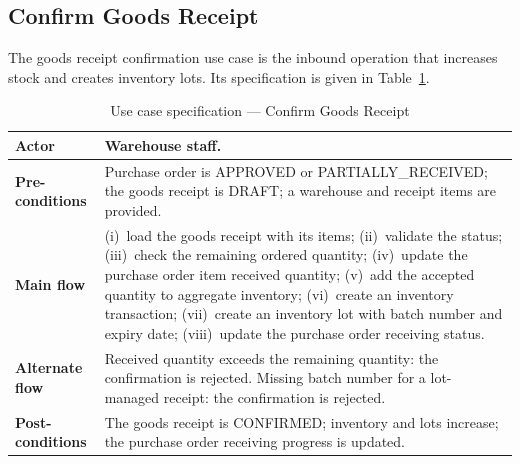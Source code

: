 \subsection{Confirm Goods Receipt}
The goods receipt confirmation use case is the inbound operation that increases
stock and creates inventory lots. Its specification is given in
Table~\ref{tab:uc-gr}.
\begin{table}[H]\centering
\caption{Use case specification --- Confirm Goods Receipt}
\label{tab:uc-gr}
\begin{tabular}{|p{3cm}|p{11cm}|}
\hline
\textbf{Actor} & Warehouse staff. \\ \hline
\textbf{Pre-conditions} & Purchase order is APPROVED or PARTIALLY\_RECEIVED; the goods receipt is DRAFT; a warehouse and receipt items are provided. \\ \hline
\textbf{Main flow} & (i)~load the goods receipt with its items; (ii)~validate the status; (iii)~check the remaining ordered quantity; (iv)~update the purchase order item received quantity; (v)~add the accepted quantity to aggregate inventory; (vi)~create an inventory transaction; (vii)~create an inventory lot with batch number and expiry date; (viii)~update the purchase order receiving status. \\ \hline
\textbf{Alternate flow} & Received quantity exceeds the remaining quantity: the confirmation is rejected. Missing batch number for a lot-managed receipt: the confirmation is rejected. \\ \hline
\textbf{Post-conditions} & The goods receipt is CONFIRMED; inventory and lots increase; the purchase order receiving progress is updated. \\ \hline
\end{tabular}
\end{table}

